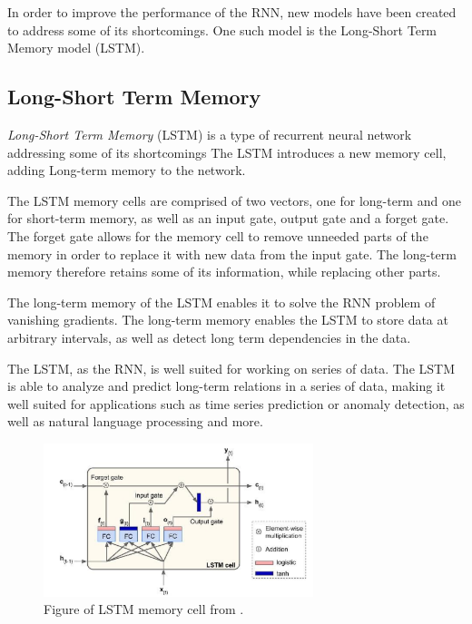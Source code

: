 In order to improve the performance of the RNN, new models have been created to address some of its shortcomings.
One such model is the Long-Short Term Memory model (LSTM).


\cite[p.~469-472]{Geron2017}


\subsection{Long-Short Term Memory}
\label{section:BT:LSTM}

\textit{Long-Short Term Memory} (LSTM) is a type of recurrent neural network addressing some of its shortcomings
The LSTM introduces a new memory cell, adding Long-term memory to the network.

The LSTM memory cells are comprised of two vectors, one for long-term and one for short-term memory,
as well as an input gate, output gate and a forget gate.
The forget gate allows for the memory cell to remove unneeded parts of the memory in order to replace it with new data from the input gate.
The long-term memory therefore retains some of its information, while replacing other parts.

The long-term memory of the LSTM enables it to solve the RNN problem of vanishing gradients.
The long-term memory enables the LSTM to store data at arbitrary intervals, as well as detect long term dependencies in the data.

The LSTM, as the RNN, is well suited for working on series of data.
The LSTM is able to analyze and predict long-term relations in a series of data, making it well suited for applications such as time series prediction or anomaly detection,
as well as natural language processing and more.

\begin{figure}[h!]
    \centering
    \includegraphics[width=0.7\textwidth]{./sections/BT/figures/lstm_cell_hands_on.png}
    \hfill
    \caption{Figure of LSTM memory cell from \cite[p.~492]{Geron2017}.}
    \label{fig:lstm-memory-cell}
\end{figure}




